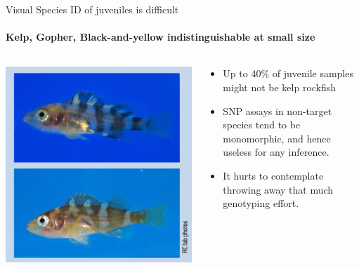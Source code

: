\documentclass[letter,graphicx]{beamer}
\begin{document}
\begin{frame}{Visual Species ID of juveniles is difficult}
\framesubtitle{Kelp, Gopher, Black-and-yellow indistinguishable at small size}
\begin{columns}
\begin{column}{0.50\textwidth}
\includegraphics[width=\textwidth]{./mhap_figs/juvie_rockfish.png}
\end{column}
\begin{column}{0.50\textwidth}
\begin{itemize}
\item Up to 40\% of juvenile samples might not be kelp rockfish
\item SNP assays in non-target species tend to be monomorphic, and hence 
useless for any inference.
\item It hurts to contemplate throwing away that much
genotyping effort.
\end{itemize}
\end{column}
\end{columns}
\end{frame}
\end{document}
